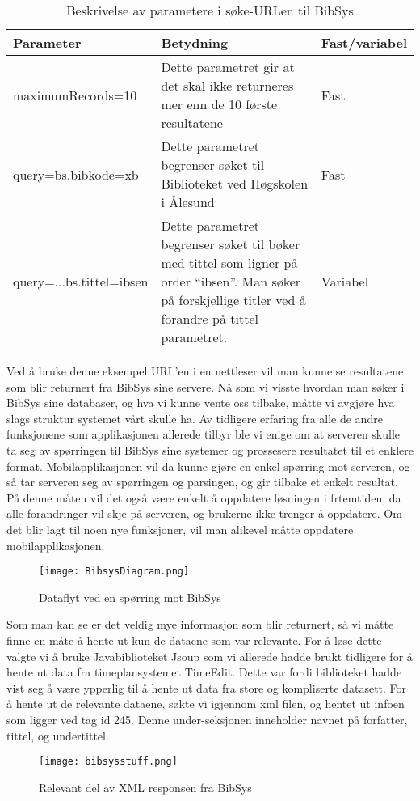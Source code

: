 \documentclass[../main.tex]{subfiles}
\begin{document}
\begin{table}[H]
\begin{center}
\caption{Beskrivelse av parametere i søke-URLen til BibSys}
  \begin{tabular}{ | p{4cm} | p{8cm} | p{2cm} |}
    \hline
    Parameter & Betydning & Fast/variabel \\ \hline
    maximumRecords=10 & Dette parametret gir at det skal ikke returneres mer enn de 10 første resultatene & Fast \\ \hline
    query=bs.bibkode=xb & Dette parametret begrenser søket til Biblioteket ved Høgskolen i Ålesund & Fast \\ \hline
    query=...bs.tittel=ibsen & Dette parametret begrenser søket til bøker med tittel som ligner på order “ibsen”. Man søker på forskjellige titler ved å forandre på tittel parametret. & Variabel \\
    \hline
  \end{tabular}
\end{center}
\end{table}

Ved å bruke denne eksempel URL’en i en nettleser vil man kunne se resultatene som blir returnert fra BibSys sine servere.\newline
\newline
Nå som vi visste hvordan man søker i BibSys sine databaser, og hva vi kunne vente oss tilbake, måtte vi avgjøre hva slags struktur systemet vårt skulle ha. Av tidligere erfaring fra alle de andre funksjonene som applikasjonen allerede tilbyr ble vi enige om at serveren skulle ta seg av spørringen til BibSys sine systemer og prossesere resultatet til et enklere format. Mobilapplikasjonen vil da kunne gjøre en enkel spørring mot serveren, og så tar serveren seg av spørringen og parsingen, og gir tilbake et enkelt resultat. På denne måten vil det også være enkelt å oppdatere løsningen i frtemtiden, da alle forandringer vil skje på serveren, og brukerne ikke trenger å oppdatere. Om det blir lagt til noen nye funksjoner, vil man alikevel måtte oppdatere mobilapplikasjonen.

\begin{figure}[H]
  \centering
  \texttt{[image: BibsysDiagram.png]}
  \caption{Dataflyt ved en spørring mot BibSys}
\end{figure}

Som man kan se er det veldig mye informasjon som blir returnert, så vi måtte finne en måte å hente ut kun de dataene som var relevante. For å løse dette valgte vi å bruke Javabiblioteket Jsoup som vi allerede hadde brukt tidligere for å hente ut data fra timeplansystemet TimeEdit. Dette var fordi biblioteket hadde vist seg å være ypperlig til å hente ut data fra store og kompliserte datasett.\newline
\newline
For å hente ut de relevante dataene, søkte vi igjennom xml filen, og hentet ut infoen som ligger ved tag id 245. Denne under-seksjonen inneholder navnet på forfatter, tittel, og undertittel.
\begin{figure}[H]
  \centering
  \texttt{[image: bibsysstuff.png]}
  \caption{Relevant del av XML responsen fra BibSys}
\end{figure}
\end{document}
